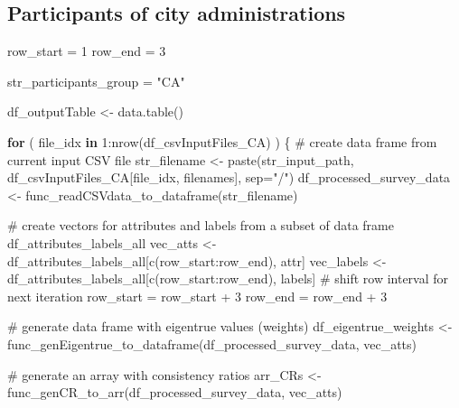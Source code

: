 \documentclass[
]{article}
\newenvironment{Shaded}{\begin{snugshade}}{\end{snugshade}}
\newcommand{\AttributeTok}[1]{\textcolor[rgb]{0.00,0.34,0.68}{#1}}
\newcommand{\CommentTok}[1]{\textcolor[rgb]{0.54,0.53,0.53}{#1}}
\newcommand{\ControlFlowTok}[1]{\textcolor[rgb]{0.12,0.11,0.11}{\textbf{#1}}}
\newcommand{\DecValTok}[1]{\textcolor[rgb]{0.69,0.50,0.00}{#1}}
\newcommand{\FunctionTok}[1]{\textcolor[rgb]{0.39,0.29,0.61}{#1}}
\newcommand{\NormalTok}[1]{\textcolor[rgb]{0.12,0.11,0.11}{#1}}
\newcommand{\OtherTok}[1]{\textcolor[rgb]{0.00,0.43,0.16}{#1}}
\newcommand{\SpecialCharTok}[1]{\textcolor[rgb]{0.24,0.68,0.91}{#1}}
\newcommand{\StringTok}[1]{\textcolor[rgb]{0.75,0.01,0.01}{#1}}
\begin{document}
\hypertarget{participants-of-city-administrations}{%
\subsection{Participants of city
administrations}\label{participants-of-city-administrations}}

\begin{Shaded}
\begin{Highlighting}[]
\NormalTok{row\_start }\OtherTok{=} \DecValTok{1}
\NormalTok{row\_end }\OtherTok{=} \DecValTok{3}

\NormalTok{str\_participants\_group }\OtherTok{=} \StringTok{"CA"}

\NormalTok{df\_outputTable }\OtherTok{\textless{}{-}} \FunctionTok{data.table}\NormalTok{()}

\ControlFlowTok{for}\NormalTok{ ( file\_idx }\ControlFlowTok{in} \DecValTok{1}\SpecialCharTok{:}\FunctionTok{nrow}\NormalTok{(df\_csvInputFiles\_CA) ) \{}
  \CommentTok{\# create data frame from current input CSV file}
\NormalTok{  str\_filename }\OtherTok{\textless{}{-}} \FunctionTok{paste}\NormalTok{(str\_input\_path, df\_csvInputFiles\_CA[file\_idx, filenames], }\AttributeTok{sep=}\StringTok{"/"}\NormalTok{)}
\NormalTok{  df\_processed\_survey\_data }\OtherTok{\textless{}{-}} \FunctionTok{func\_readCSVdata\_to\_dataframe}\NormalTok{(str\_filename)}
  
  \CommentTok{\# create vectors for attributes and labels from a subset of data frame \textquotesingle{}df\_attributes\_labels\_all\textquotesingle{}}
\NormalTok{  vec\_atts }\OtherTok{\textless{}{-}}\NormalTok{ df\_attributes\_labels\_all[}\FunctionTok{c}\NormalTok{(row\_start}\SpecialCharTok{:}\NormalTok{row\_end), attr]}
\NormalTok{  vec\_labels }\OtherTok{\textless{}{-}}\NormalTok{ df\_attributes\_labels\_all[}\FunctionTok{c}\NormalTok{(row\_start}\SpecialCharTok{:}\NormalTok{row\_end), labels]}
  \CommentTok{\# shift row interval for next iteration}
\NormalTok{  row\_start }\OtherTok{=}\NormalTok{ row\_start }\SpecialCharTok{+} \DecValTok{3}
\NormalTok{  row\_end }\OtherTok{=}\NormalTok{ row\_end }\SpecialCharTok{+} \DecValTok{3}
  
  \CommentTok{\# generate data frame with eigentrue values (weights) }
\NormalTok{  df\_eigentrue\_weights }\OtherTok{\textless{}{-}} \FunctionTok{func\_genEigentrue\_to\_dataframe}\NormalTok{(df\_processed\_survey\_data, vec\_atts)}
  
  \CommentTok{\# generate an array with consistency ratios}
\NormalTok{  arr\_CRs }\OtherTok{\textless{}{-}} \FunctionTok{func\_genCR\_to\_arr}\NormalTok{(df\_processed\_survey\_data, vec\_atts)}


\end{Highlighting}
\end{Shaded}
\end{document}
